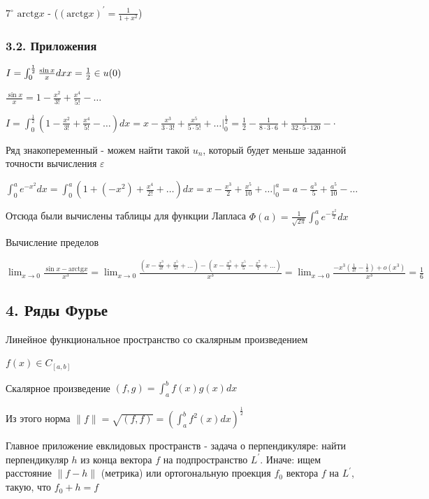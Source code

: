 \documentclass[12pt]{article}
\begin{document}
    \mediumvspace

    7$^\circ$ $\mathrm{arctg} x$ - \Lab ($(\mathrm{arctg} x)^\prime = \frac{1}{1 + x^2}$)

    \subsubsection{3.2. Приложения}

     $I = \int_0^{\frac{1}{2}} \frac{\sin x}{x} dx \hfill x = \frac{1}{2} \in u(0)$

    $\frac{\sin x}{x} = 1 - \frac{x^2}{3!} + \frac{x^4}{5!} - \dots$

    $I = \int_0^{\frac{1}{2}} (1 - \frac{x^2}{3!} + \frac{x^4}{5!} - \dots) dx = x - \frac{x^3}{3 \cdot 3!} + \frac{x^5}{5 \cdot 5!} + \dots \Big|_{0}^{\frac{1}{2}} = 
    \frac{1}{2} - \frac{1}{8 \cdot 3 \cdot 6} + \frac{1}{32 \cdot 5 \cdot 120} - \cdot$

    Ряд знакопеременный - можем найти такой $u_n$, который будет меньше заданной точности вычисления $\varepsilon$

     $\int_0^{a} e^{-x^2} dx = \int_0^a (1 + (-x^2) + \frac{x^4}{2!} + \dots) dx = x - \frac{x^3}{2} + \frac{x^5}{10} + \dots \Big|_0^a = a - \frac{a^3}{5} + \frac{a^5}{10} - \dots$

    Отсюда были вычислены таблицы для функции Лапласа $\Phi(a) = \frac{1}{\sqrt{2\pi}} \int_0^a e^{-\frac{x^2}{2}} dx$

     Вычисление пределов

    $\lim_{x \to 0} \frac{\sin x - \mathrm{arctg} x}{x^3} = \lim_{x \to 0} \frac{(x - \frac{x^3}{3!} + \frac{x^5}{5!} + \dots) - (x - \frac{x^3}{3} + \frac{x^5}{5} - \frac{x^7}{7} + \dots)}{x^3} = 
    \lim_{x \to 0} \frac{-x^3 (\frac{1}{3!} - \frac{1}{3}) + o(x^3)}{x^3} = \frac{1}{6}$

    \subsection{4. Ряды Фурье}

    \Mem Линейное функциональное пространство со скалярным произведением

    $f(x) \in C_{[a,b]}$

    Скалярное произведение $(f, g) = \int_a^b f(x)g(x) dx$

    Из этого норма $\|f\| = \sqrt{(f,f)} = \left(\int_a^b f^2(x) dx\right)^\frac{1}{2}$

    Главное приложение евклидовых пространств - задача о перпендикуляре: найти перпендикуляр $h$ из конца вектора $f$ на подпространство $L^\prime$.
    Иначе: ищем расстояние $\|f - h\|$ (метрика) или ортогональную проекция $f_0$ вектора $f$ на $L^\prime$, такую, что $f_0 + h = f$
\end{document}

